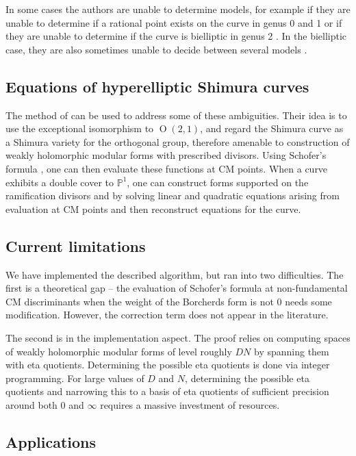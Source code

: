 \documentclass[12pt]{amsart}
\renewcommand{\P}{\mathbb{P}}
\DeclareMathOperator{\Orth}{O}
\numberwithin{equation}{subsection}
\theoremstyle{plain}\newtheorem{ithm}{Theorem}
\theoremstyle{plain}\newtheorem{iprop}[ithm]{Proposition}
\theoremstyle{definition}
\theoremstyle{remark}
\begin{document}
In some cases the authors are unable to determine models, for example if they are unable to determine if a rational point exists on the curve in genus 0 and 1 \cite[Tables 1,6,7]{OanaFreddy} or if they are unable to determine if the curve is bielliptic in genus 2 \cite[Table 10]{OanaFreddy}. In the bielliptic case, they are also sometimes unable to decide between several models \cite[Remark 8.5]{OanaFreddy}.

\subsection{Equations of hyperelliptic Shimura curves}
The method of \cite{GY17} can be used to address some of these ambiguities.
Their idea is to use the exceptional isomorphism to $\Orth(2,1)$, and regard the Shimura curve as a Shimura variety for the orthogonal group, therefore amenable to construction of weakly holomorphic modular forms with prescribed divisors. Using Schofer's formula \cite{Schofer09}, one can then evaluate these functions at CM points. When a curve exhibits a double cover to $\P^1$, one can construct forms supported on the ramification divisors and by solving linear and quadratic equations arising from evaluation at CM points and then reconstruct equations for the curve. 

\subsection{Current limitations}
\label{sec:limits}
We have implemented the described algorithm, but ran into two difficulties. The first is a theoretical gap -- the evaluation of Schofer's formula at non-fundamental CM discriminants when the weight of the Borcherds form is not $0$ needs some modification. However, the correction term does not appear in the literature.

The second is in the implementation aspect. The proof relies on computing spaces of weakly holomorphic modular forms of level roughly $DN$ by spanning them with eta quotients. Determining the possible eta quotients is done via integer programming. For large values of $D$ and $N$, determining the possible eta quotients and narrowing this to a basis of eta quotients of sufficient precision around both $0$ and $\infty$ requires a massive investment of resources.

\subsection{Applications}
\end{document}
